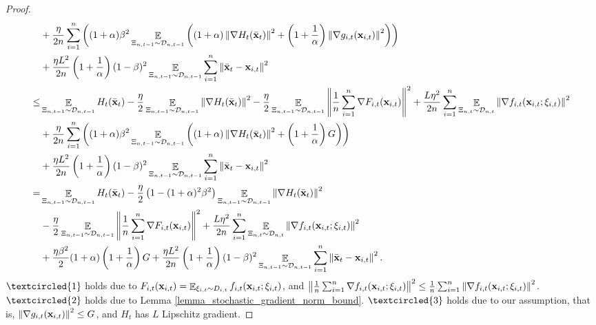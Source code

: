 \documentclass{article}
\begin{document}
\begin{proof}
\begin{align}
& + \frac{\eta}{2n}\sum_{i=1}^n\left( (1+\alpha)\beta^2\mathop{\mathbb{E}}_{ \Xi_{n,t-1} \sim \mathcal{D}_{n,t-1} }\left(  (1+\alpha)  \left\lVert\nabla H_t(\bar{{\bf x}}_t) \right\rVert^2 +  \left( 1+\frac{1}{\alpha} \right)   \left\lVert\nabla g_{i,t}({\bf x}_{i,t})\right\rVert^2  \right)  \right) \\ \nonumber 
& + \frac{\eta L^2}{2n} \left( 1+\frac{1}{\alpha} \right)(1-\beta)^2\mathop{\mathbb{E}}_{ \Xi_{n,t-1} \sim \mathcal{D}_{n,t-1} }\sum_{i=1}^n\left\lVert\bar{{\bf x}}_t - {\bf x}_{i,t}\right\rVert^2    \\ \nonumber
\le & \mathop{\mathbb{E}}_{ \Xi_{n,t-1} \sim \mathcal{D}_{n,t-1} } H_t(\bar{{\bf x}}_t) - \frac{\eta}{2}\mathop{\mathbb{E}}_{ \Xi_{n,t-1} \sim \mathcal{D}_{n,t-1} }\left\lVert\nabla H_t(\bar{{\bf x}}_t)\right\rVert^2 - \frac{\eta}{2}\mathop{\mathbb{E}}_{ \Xi_{n,t-1} \sim \mathcal{D}_{n,t-1} }\left\lVert\frac{1}{n}\sum_{i=1}^n \nabla F_{i,t}({\bf x}_{i,t})\right\rVert^2  + \frac{L\eta^2}{2n}\sum_{i=1}^n\mathop{\mathbb{E}}_{ \Xi_{n,t} \sim \mathcal{D}_{n,t} }\left\lVert \nabla f_{i,t}({\bf x}_{i,t};\xi_{i,t})\right\rVert^2 \\ \nonumber
& + \frac{\eta}{2n}\sum_{i=1}^n\left( (1+\alpha)\beta^2\mathop{\mathbb{E}}_{ \Xi_{n,t-1} \sim \mathcal{D}_{n,t-1} }\left(  (1+\alpha)  \left\lVert\nabla H_t(\bar{{\bf x}}_t) \right\rVert^2 +  \left( 1+\frac{1}{\alpha} \right)  G  \right)  \right) \\ \nonumber 
& + \frac{\eta L^2}{2n} \left( 1+\frac{1}{\alpha} \right)(1-\beta)^2\mathop{\mathbb{E}}_{ \Xi_{n,t-1} \sim \mathcal{D}_{n,t-1} }\sum_{i=1}^n\left\lVert\bar{{\bf x}}_t - {\bf x}_{i,t}\right\rVert^2    \\ \nonumber
= & \mathop{\mathbb{E}}_{ \Xi_{n,t-1} \sim \mathcal{D}_{n,t-1} } H_t(\bar{{\bf x}}_t) - \frac{\eta}{2} \left(  1-(1+\alpha)^2\beta^2  \right) \mathop{\mathbb{E}}_{ \Xi_{n,t-1} \sim \mathcal{D}_{n,t-1} }\left\lVert\nabla H_t(\bar{{\bf x}}_t)\right\rVert^2 \\ \nonumber 
& - \frac{\eta}{2}  \mathop{\mathbb{E}}_{ \Xi_{n,t-1} \sim \mathcal{D}_{n,t-1} }\left\lVert\frac{1}{n}\sum_{i=1}^n \nabla F_{i,t}({\bf x}_{i,t})\right\rVert^2  + \frac{L\eta^2}{2n}\sum_{i=1}^n\mathop{\mathbb{E}}_{ \Xi_{n,t} \sim \mathcal{D}_{n,t} }\left\lVert \nabla f_{i,t}({\bf x}_{i,t};\xi_{i,t})\right\rVert^2 \\ \nonumber
& + \frac{\eta \beta^2}{2} (1+\alpha) \left( 1+\frac{1}{\alpha} \right)  G  + \frac{\eta L^2}{2n} \left( 1+\frac{1}{\alpha} \right)(1-\beta)^2\mathop{\mathbb{E}}_{ \Xi_{n,t-1} \sim \mathcal{D}_{n,t-1} }\sum_{i=1}^n\left\lVert\bar{{\bf x}}_t - {\bf x}_{i,t}\right\rVert^2.
\end{align} $\textcircled{1}$ holds due to $F_{i,t}({\bf x}_{i,t}) = \mathop{\mathbb{E}}_{\xi_{i,t} \sim D_{i,t}} f_{i,t}({\bf x}_{i,t}; \xi_{i,t})$, and $\left\lVert\frac{1}{n}\sum_{i=1}^n \nabla f_{i,t}({\bf x}_{i,t};\xi_{i,t})\right\rVert^2 \le \frac{1}{n}\sum_{i=1}^n\left\lVert\nabla f_{i,t}({\bf x}_{i,t};\xi_{i,t})\right\rVert^2$. $\textcircled{2}$ holds due to Lemma \ref{lemma_stochastic_gradient_norm_bound}. $\textcircled{3}$ holds due to our assumption, that is, $\left\lVert\nabla g_{i,t}({\bf x}_{i,t})\right\rVert^2\le G$, and $H_t$ has $L$ Lipschitz gradient. 



\end{proof}
\end{document}
